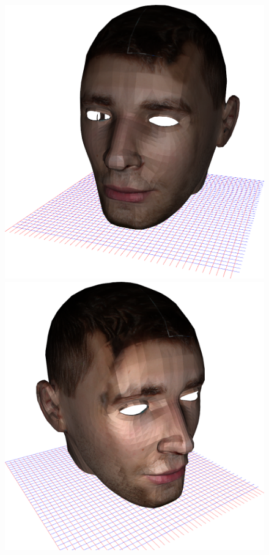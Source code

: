 \documentclass{article}
\begin{document}
\begin{figure}[H]
    \begin{minipage}{.5\textwidth}
        \centering
        \includegraphics[width=\linewidth]{pic_1.png}
    \end{minipage}%
    \begin{minipage}{.5\textwidth}
        \centering
        \includegraphics[width=\linewidth]{pic_4.png}
    \end{minipage}
\end{figure}
\vfill
\end{document}
